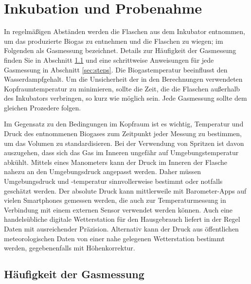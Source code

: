 \documentclass[]{article}
\begin{document}
\section{Inkubation und Probenahme}
\label{sec:incsam}
In regelmäßigen Abständen werden die Flaschen aus dem Inkubator entnommen, um das produzierte Biogas zu entnehmen und die Flaschen zu wiegen; im  Folgenden als Gasmessung bezeichnet.
Details zur Häufigkeit der Gasmessung finden Sie in Abschnitt \ref{sec:freq} und eine schrittweise Anweisungen für jede Gasmessung in Abschnitt \ref{sec:steps}.
Die Biogastemperatur beeinflusst den Wasserdampfgehalt.
Um die Unsicherheit der in den Berechnungen verwendeten Kopfraumtemperatur zu minimieren, sollte die Zeit, die die Flaschen außerhalb des Inkubators verbringen, so kurz wie möglich sein. Jede Gasmessung sollte dem gleichen Prozedere folgen.

Im Gegensatz zu den Bedingungen im Kopfraum ist es wichtig,  Temperatur und Druck des entnommenen Biogases zum Zeitpunkt jeder Messung zu bestimmen, um das Volumen zu standardisieren.
Bei der Verwendung von Spritzen ist davon auszugehen, dass sich das Gas im Inneren ungefähr auf Umgebungstemperatur abkühlt.
Mittels eines Manometers kann der Druck im Inneren der Flasche nahezu an den Umgebungsdruck angepasst werden.
Daher müssen Umgebungsdruck und -temperatur sinnvollerweise bestimmt oder notfalls geschätzt werden.
Der absolute Druck kann mittlerweile mit Barometer-Apps auf vielen Smartphones gemessen werden, die auch zur Temperaturmessung in Verbindung mit einem externen Sensor verwendet werden können. Auch eine handelsübliche digitale Wetterstation für den Hausgebrauch liefert in der Regel Daten mit ausreichender Präzision.
Alternativ kann der Druck aus öffentlichen meteorologischen Daten von einer nahe gelegenen Wetterstation bestimmt werden, gegebenenfalls mit Höhenkorrektur.

\subsection{Häufigkeit der Gasmessung}
\label{sec:freq}
\end{document}
